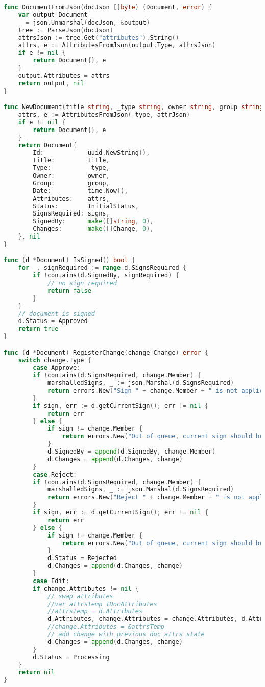 \begin{lstlisting}[language=Go]
func DocumentFromJson(docJson []byte) (Document, error) {
	var output Document
	_ = json.Unmarshal(docJson, &output)
	tree := ParseJson(docJson)
	attrsJson := tree.Get("attributes").String()
	attrs, e := AttributesFromJson(output.Type, attrsJson)
	if e != nil {
		return Document{}, e
	}
	output.Attributes = attrs
	return output, nil
}

func NewDocument(title string, _type string, owner string, group string, attrJson string, signs []string) (Document, error) {
	attrs, e := AttributesFromJson(_type, attrJson)
	if e != nil {
		return Document{}, e
	}
	return Document{
		Id:            uuid.NewString(),
		Title:         title,
		Type:          _type,
		Owner:         owner,
		Group:         group,
		Date:          time.Now(),
		Attributes:    attrs,
		Status:        InitialStatus,
		SignsRequired: signs,
		SignedBy:      make([]string, 0),
		Changes:       make([]Change, 0),
	}, nil
}

func (d *Document) IsSigned() bool {
	for _, signRequired := range d.SignsRequired {
		if !contains(d.SignedBy, signRequired) {
			// no sign required
			return false
		}
	}
	// document is signed
	d.Status = Approved
	return true
}

func (d *Document) RegisterChange(change Change) error {
	switch change.Type {
		case Approve:
		if !contains(d.SignsRequired, change.Member) {
			marshalledSigns, _ := json.Marshal(d.SignsRequired)
			return errors.New("Sign " + change.Member + " is not applicable to the doc, only " + string(marshalledSigns) + " are")
		}
		if sign, err := d.getCurrentSign(); err != nil {
			return err
		} else {
			if sign != change.Member {
				return errors.New("Out of queue, current sign should be " + sign)
			}
			d.SignedBy = append(d.SignedBy, change.Member)
			d.Changes = append(d.Changes, change)
		}
		case Reject:
		if !contains(d.SignsRequired, change.Member) {
			marshalledSigns, _ := json.Marshal(d.SignsRequired)
			return errors.New("Reject " + change.Member + " is not applicable to the doc, only " + string(marshalledSigns) + " are")
		}
		if sign, err := d.getCurrentSign(); err != nil {
			return err
		} else {
			if sign != change.Member {
				return errors.New("Out of queue, current sign should be " + sign)
			}
			d.Status = Rejected
			d.Changes = append(d.Changes, change)
		}
		case Edit:
		if change.Attributes != nil {
			// swap attributes
			//var attrsTemp IDocAttributes
			//attrsTemp = d.Attributes
			d.Attributes, change.Attributes = change.Attributes, d.Attributes
			//change.Attributes = &attrsTemp
			// add change with previous doc attrs state
			d.Changes = append(d.Changes, change)
		}
		d.Status = Processing
	}
	return nil
}


\end{lstlisting}
